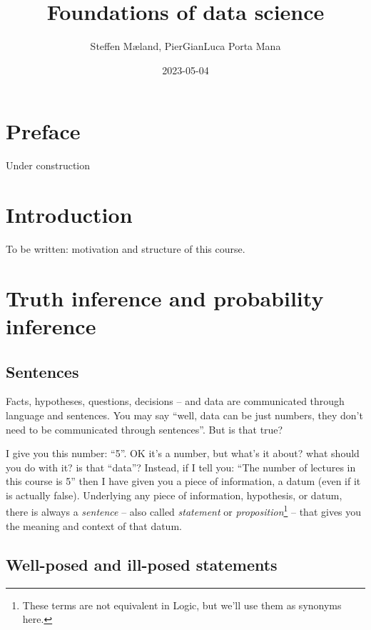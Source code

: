 \documentclass[]{book}
\title{Foundations of data science}
\author{Steffen Mæland, PierGianLuca Porta Mana}
\date{2023-05-04}
\begin{document}
\maketitle

{
\setcounter{tocdepth}{1}
\tableofcontents
}
\hypertarget{preface}{%
\chapter*{Preface}\label{preface}}

Under construction

\hypertarget{intro}{%
\chapter{Introduction}\label{intro}}

To be written: motivation and structure of this course.

\hypertarget{truth-inference-and-probability-inference}{%
\chapter{Truth inference and probability inference}\label{truth-inference-and-probability-inference}}

\hypertarget{sentences}{%
\section{Sentences}\label{sentences}}

Facts, hypotheses, questions, decisions -- and data are communicated through language and sentences. You may say ``well, data can be just numbers, they don't need to be communicated through sentences''. But is that true?

I give you this number: ``5''. OK it's a number, but what's it about? what should you do with it? is that ``data''? Instead, if I tell you: ``The number of lectures in this course is 5'' then I have given you a piece of information, a datum (even if it is actually false). Underlying any piece of information, hypothesis, or datum, there is always a \emph{sentence} -- also called \emph{statement} or \emph{proposition}\footnote{These terms are not equivalent in Logic, but we'll use them as synonyms here.} -- that gives you the meaning and context of that datum.

\hypertarget{well-posed-and-ill-posed-statements}{%
\section{Well-posed and ill-posed statements}\label{well-posed-and-ill-posed-statements}}
\end{document}
